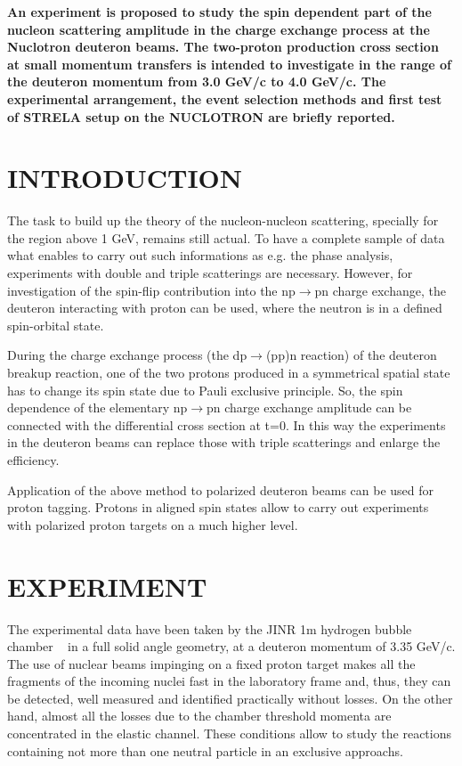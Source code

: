 \documentclass[a4paper,12pt]{article}
\begin{document}
    {\large\bf An experiment is proposed to study the spin dependent part of the nucleon
      scattering amplitude in the   charge exchange process at the Nuclotron
      deuteron beams. The two-proton production cross section at small momentum
      transfers is intended to investigate in the range of
      the deuteron momentum from 3.0 GeV/c to 4.0 GeV/c. The experimental
      arrangement, the event selection methods and first test of STRELA setup
      on the NUCLOTRON are briefly reported.}

    \section{INTRODUCTION}
    \indent
    The task to build up the theory of the nucleon-nucleon scattering, specially
    for the region above 1 GeV, remains still actual. To have a complete sample
    of data what enables to carry out such informations as e.g. the phase analysis,
    experiments with double and triple scatterings are necessary. However, for investigation
    of the spin-flip contribution into the np$\to$pn charge exchange, the deuteron
    interacting with proton can be used, where the neutron is in a defined spin-orbital
    state.

    During the charge exchange process (the dp$\to$(pp)n reaction) of the deuteron
    breakup reaction, one of the two protons produced in a symmetrical spatial state has
    to change its spin state due to Pauli exclusive principle. So, the spin
    dependence of the elementary np$\to$pn charge exchange amplitude can be
    connected with the differential cross section at t=0. In this way the
    experiments in the deuteron beams can replace those with triple scatterings
    and enlarge the efficiency.

    Application of the above method to polarized deuteron beams can be used for
    proton tagging. Protons in aligned spin states allow to carry
    out experiments with  polarized proton targets on a much higher level.

    \section{EXPERIMENT}
    The experimental data have been taken by the JINR 1m hydrogen bubble
    chamber ~\cite{gla} in a full solid angle geometry, at a deuteron momentum of
    3.35 GeV/c. The use of nuclear
    beams impinging on a fixed proton target makes all the fragments of the
    incoming nuclei fast in the laboratory frame and, thus, they can be detected,
    well measured and identified practically without losses. On the other hand,
    almost all the losses due to the chamber threshold momenta are concentrated
    in the elastic channel. These conditions allow to study the reactions containing
    not more than one neutral particle in an exclusive approachs.
\end{document}
